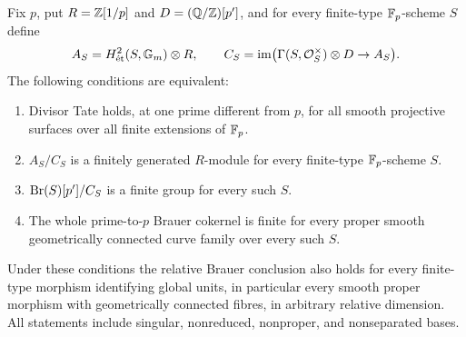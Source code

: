 \begin{theorem}
\label{thm:B-Brauer-prime-uniform}
Fix \(p\), put \(R=\mathbb Z[1/p]\) and \(D=(\mathbb Q/\mathbb Z)[p']\),
and for every finite-type \(\mathbb F_p\)-scheme \(S\) define
\[
 A_S=H^2_{\mathrm{\acute et}}(S,{\mathbb G_m})\otimes R,
 \qquad C_S=\operatorname{im}
 \bigl(\Gamma(S,\mathcal O_S^\times)\otimes D\to A_S\bigr).
\]
The following conditions are equivalent:
\begin{enumerate}[label=(\roman*)]
\item Divisor Tate holds, at one prime different from \(p\),
      for all smooth projective surfaces over all finite
      extensions of \(\mathbb F_p\).
\item \(A_S/C_S\) is a finitely generated \(R\)-module
      for every finite-type \(\mathbb F_p\)-scheme \(S\).
\item \(\operatorname{Br}(S)[p']/C_S\) is a finite group for every such
      \(S\).
\item The whole prime-to-\(p\) Brauer cokernel is finite for
      every proper smooth geometrically connected curve family
      over every such \(S\).
\end{enumerate}
Under these conditions the relative Brauer conclusion also holds
for every finite-type morphism identifying global units,
in particular every smooth proper morphism with geometrically
connected fibres, in arbitrary relative dimension.
All statements include singular, nonreduced, nonproper, and
nonseparated bases.
\end{theorem}
